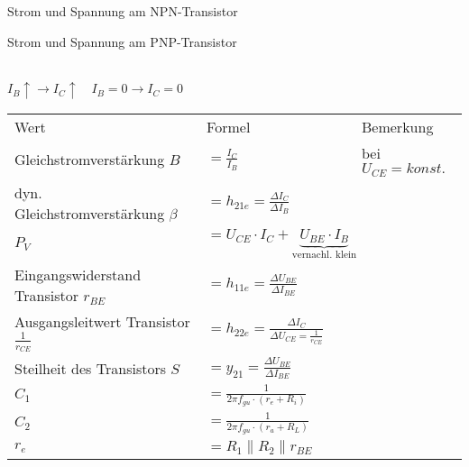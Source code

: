 
\begin{minipage}{0.5\columnwidth}
    Strom und Spannung am NPN-Transistor
\end{minipage}
\begin{minipage}{0.5\columnwidth}
    Strom und Spannung am PNP-Transistor    
\end{minipage}
\noindent\\
$I_B\uparrow\rightarrow I_C\uparrow\quad I_B=0\rightarrow I_C=0$
\renewcommand{\arraystretch}{1.0}
\begin{table}[H]
    \begin{tabularx}{\columnwidth}{l l l}
        Wert                                           & Formel                                                                   & Bemerkung \\
        Gleichstromverstärkung $B$                     & $=\frac{I_C}{I_B}$                                                       & bei $U_{CE}=konst.$ \\
        dyn. Gleichstromverstärkung $\beta$            & $=h_{21e}=\frac{\Delta I_C}{\Delta I_B}$                                 & \\
        $P_V$                                          & $=U_{CE}\cdot I_C + \underbrace{U_{BE}\cdot I_B}_\text{vernachl. klein}$ & \\
        Eingangswiderstand Transistor $r_{BE}$         & $=h_{11e}=\frac{\Delta U_{BE}}{\Delta I_{BE}}$                           & \\
        Ausgangsleitwert Transistor $\frac{1}{r_{CE}}$ & $=h_{22e}=\frac{\Delta I_C}{\Delta U_{CE}=\frac{1}{r_{CE}}}$             & \\
        Steilheit des Transistors $S$                  & $=y_{21}=\frac{\Delta U_{BE}}{\Delta I_{BE}}$                            & \\
        $C_1$                                          & $=\frac{1}{2\pi f_{gu}\cdot (r_e+R_i)}$                                  & \\
        $C_2$                                          & $=\frac{1}{2\pi f_{gu}\cdot (r_a+R_L)}$                                  & \\
        $r_e$                                          & $=R_1\parallel R_2\parallel r_{BE}$                                      & \\
    \end{tabularx}
\end{table}
